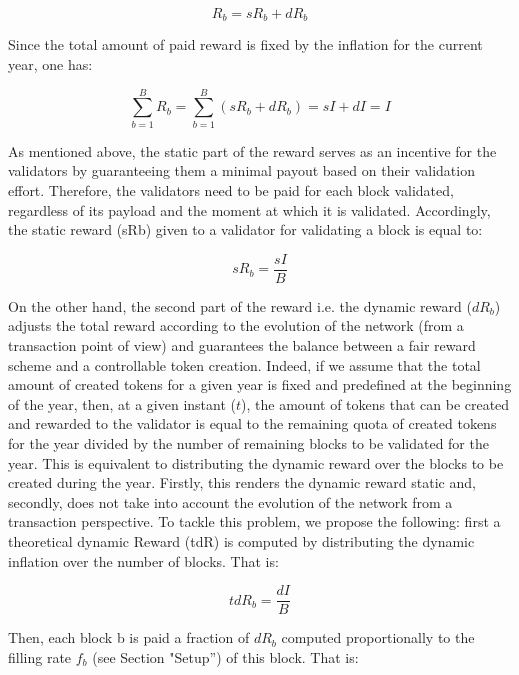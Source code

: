 \documentclass[conference]{IEEEtran}
\begin{document}
\begin{equation}
		R_b = sR_b +dR_b
\end{equation}

Since the total amount of paid reward is fixed by the inflation for the current year, one has:

\begin{equation}
		\sum_{b=1}^{B}R_b=\sum_{b=1}^{B}(sR_b +dR_b) =sI + dI = I
\end{equation}

As mentioned above, the static part of the reward serves as an incentive for the validators by guaranteeing them a minimal payout based on their validation effort. Therefore, the validators  need to be paid for each block validated, regardless of its payload and the moment at which it is validated. Accordingly, the static reward (sRb) given to a validator for validating a block is equal to:

\begin{equation}
		sR_b=\frac{sI}{B}
\end{equation}

On the other hand, the second part of the reward i.e. the dynamic reward ($dR_b$) adjusts the total reward according to the evolution of the network (from a transaction point of view) and guarantees the balance between a fair reward scheme and a controllable token creation. Indeed, if we assume that the total amount of created tokens for a given year is fixed and predefined at the beginning of the year, then, at a given instant ($t$), the amount of tokens that can be created and rewarded to the validator is equal to the remaining quota of created tokens for the year divided by the number of remaining blocks to be validated for the year. This is equivalent to distributing the dynamic reward over the blocks to be created during the year. Firstly, this renders the dynamic reward static and, secondly, does not take into account the evolution of the network from a transaction perspective. To tackle this problem, we propose the following: first a theoretical dynamic Reward (tdR) is computed by distributing the dynamic inflation over the number of blocks. That is:

\begin{equation}
			tdR_b=\frac{dI}{B}
\end{equation}

Then, each block b is paid a fraction of $dR_b$ computed proportionally to the filling rate $f_b$ (see Section "Setup'') of this block. That is:
\end{document}
